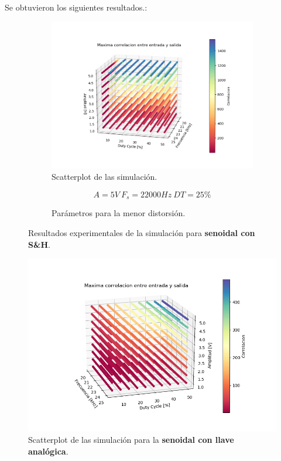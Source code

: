 Se obtuvieron los siguientes resultados.:
\begin{figure}[H]
\centering
\begin{subfigure}{\linewidth}
\includegraphics[width=\linewidth]{ImagenesEjercicio6/scatter_sh_seno.png}
\caption{Scatterplot de las simulación.}
\end{subfigure}

\begin{subfigure}{\linewidth}
\[A = 5V \ F_s = 22000Hz \ DT = 25\%\]
\caption{Parámetros para la menor distorsión.}
\end{subfigure}
\label{seno_sh}
\caption{Resultados experimentales de la simulación para \textbf{senoidal con S\&H}.}
\end{figure}

\begin{figure}[H]
\centering
	\includegraphics[width=0.8\linewidth]{ImagenesEjercicio6/scatter_llave_seno.png}
	\caption{Scatterplot de las simulación para la \textbf{senoidal con llave analógica}.}
	\label{seno_llave}
\end{figure}

